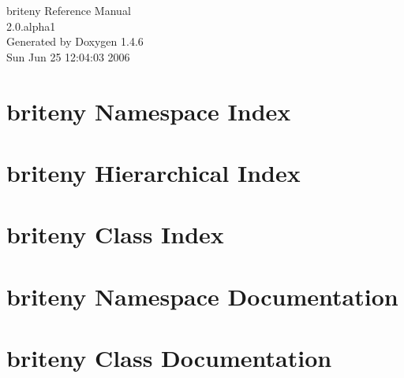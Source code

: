 \documentclass[a4paper]{book}
\begin{document}
\begin{titlepage}
\vspace*{7cm}
\begin{center}
{\Large briteny Reference Manual\\[1ex]\large 2.0.alpha1 }\\
\vspace*{1cm}
{\large Generated by Doxygen 1.4.6}\\
\vspace*{0.5cm}
{\small Sun Jun 25 12:04:03 2006}\\
\end{center}
\end{titlepage}
\clearemptydoublepage
{}
\tableofcontents
\clearemptydoublepage
{}
\chapter{briteny Namespace Index}

\chapter{briteny Hierarchical Index}

\chapter{briteny Class Index}

\chapter{briteny Namespace Documentation}


\chapter{briteny Class Documentation}


\printindex
\end{document}
